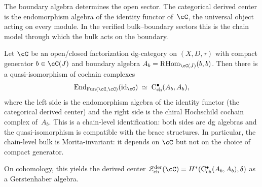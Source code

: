\medskip

The boundary algebra determines the open sector. The categorical
derived center is the endomorphism algebra of the identity functor
of~$\cC$, the universal object acting on every module. In the
verified bulk--boundary sectors this is the chain model through which
the bulk acts on the boundary.

\begin{corollary}
\label{cor:bulk-derived-center-categorical}
Let\/ $\cC$ be an open/closed factorization dg-category on
$(X,D,\tau)$ with compact generator\/ $b \in \cC(J)$ and boundary
algebra\/ $A_b = \RHom_{\cC(J)}(b,b)$. Then there is a
quasi-isomorphism of cochain complexes
\[
 \End_{\operatorname{Fun}(\cC,\cC)}(\id_\cC)
 \;\simeq\;
 \mathrm{C}^\bullet_{\mathrm{ch}}(A_b, A_b),
\]
where the left side is the endomorphism algebra of the identity
functor\/ \textup{(}the categorical derived center\textup{)} and the
right side is the chiral Hochschild cochain complex of\/~$A_b$.
This is a chain-level identification: both sides are dg algebras
and the quasi-isomorphism is compatible with the brace structures.
In particular, the chain-level bulk is Morita-invariant: it depends
on\/ $\cC$ but not on the choice of compact generator.

On cohomology, this yields the derived center\/
$\cZ^{\mathrm{der}}_{\mathrm{ch}}(\cC)
= H^*(\mathrm{C}^\bullet_{\mathrm{ch}}(A_b, A_b), \delta)$
as a Gerstenhaber algebra.
\end{corollary}

